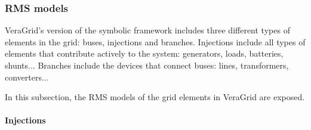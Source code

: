 \subsubsection{RMS models}

VeraGrid's version of the symbolic framework includes three different types of elements in the grid: buses, injections and branches. Injections include all types of elements
that contribute actively to the system: generators, loads, batteries, shunts... Branches include the devices that connect buses: lines, transformers, converters... 

In this subsection, the RMS models of the grid elements in VeraGrid are exposed.

\paragraph{Injections}

